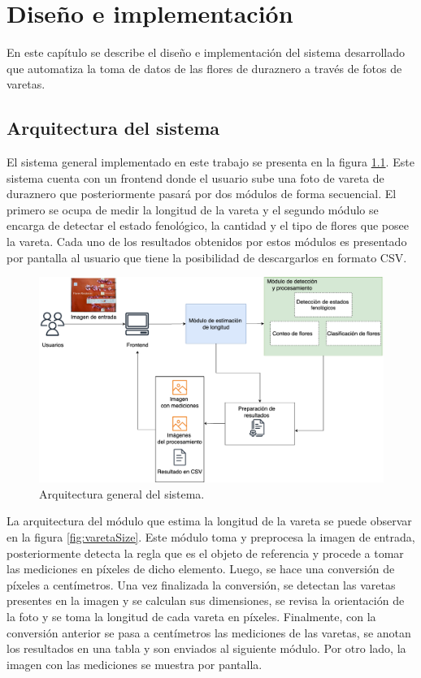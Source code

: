 \chapter{Diseño e implementación} %

\label{Chapter3} %

En este capítulo se describe el diseño e implementación del sistema desarrollado que automatiza la toma de datos de las flores de duraznero a través de fotos de varetas.

\section{Arquitectura del sistema}
\label{section3.1}

El sistema general implementado en este trabajo se presenta en la figura \ref{fig:sistemaGeneral}. Este sistema cuenta con un frontend donde el usuario sube una foto de vareta de duraznero que posteriormente pasará por dos módulos de forma secuencial. El primero se ocupa de medir la longitud de la vareta y el segundo módulo se encarga de detectar el estado fenológico, la cantidad y el tipo de flores que posee la vareta. Cada uno de los resultados obtenidos por estos módulos es presentado por pantalla al usuario que tiene la posibilidad de descargarlos en formato CSV.

\begin{figure}[ht]
	\centering
	\includegraphics[scale=.32]{./Figures/Tesis.drawio.png}
	\caption{Arquitectura general del sistema.}
	\label{fig:sistemaGeneral}
\end{figure}

La arquitectura del módulo que estima la longitud de la vareta se puede observar en la figura \ref{fig:varetaSize}. Este módulo toma y preprocesa la imagen de entrada, posteriormente detecta la regla que es el objeto de referencia y procede a tomar las mediciones en píxeles de dicho elemento. Luego, se hace una conversión de píxeles a centímetros. Una vez finalizada la conversión, se detectan las varetas presentes en la imagen y se calculan sus dimensiones, se revisa la orientación de la foto y se toma la longitud de cada vareta en píxeles. Finalmente, con la conversión anterior se pasa a centímetros las mediciones de las varetas, se anotan los resultados en una tabla y son enviados al siguiente módulo. Por otro lado, la imagen con las mediciones se muestra por pantalla.

